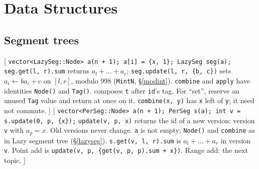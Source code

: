 \section{Data Structures}
\threelevels
{}

\subsection{Segment trees}
[
	 \texttt{vector<LazySeg::Node> a(n + 1); a[i] = \{x, 1\}; LazySeg seg(a);}
	 \texttt{seg.get(l, r).sum} returns $a_l + \dots + a_r$; \texttt{seg.update(l, r, \{b, c\})} sets $a_i \gets b a_i + c$ on $[l, r]$, modulo 998 (\texttt{MintN}, \S\ref{modint}).
	 \texttt{combine} and \texttt{apply} have identities \texttt{Node()} and \texttt{Tag()}.
	 composes \texttt{t} after \texttt{id}'s tag. For ``set'', reserve an unused \texttt{Tag} value and return at once on it.
	 \texttt{combine(x, y)} has \texttt{x} left of \texttt{y}; it need not commute.
]\label{lazyseg}
[
	 \texttt{vector<PerSeg::Node> a(n + 1); PerSeg s(a); int v = s.update(0, p, \{x\});}
	 \texttt{update(v, p, x)} returns the id of a new version: version \texttt{v} with $a_p = x$. Old versions never change.
	 \texttt{a} is not empty; \texttt{Node()} and \texttt{combine} as in Lazy segment tree (\S\ref{lazyseg}).
	 \texttt{s.get(v, l, r).sum} is $a_l + \dots + a_r$ in version \texttt{v}.
	 Point add is \texttt{update(v, p, \{get(v, p, p).sum + x\})}. Range add: the next topic.
]\label{perseg}
